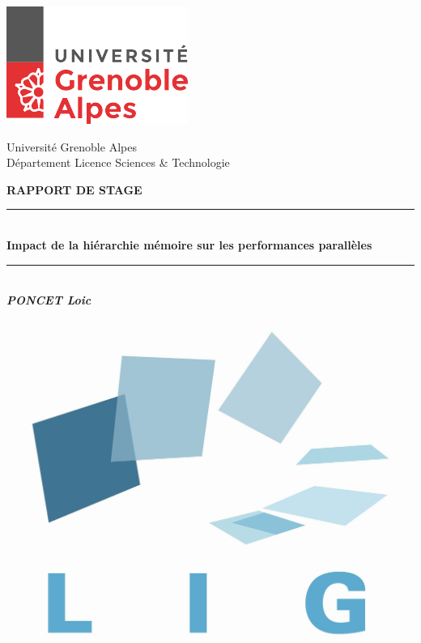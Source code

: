 \documentclass[a4paper,12pt]{report}
\begin{document}
\begin{titlepage}

\begin{center}
	\begin{flushright} %
		\includegraphics[scale=0.8]{logo-uga.png}\\[1.5cm]
	\end{flushright}
	\large{Université Grenoble Alpes\\
		   Département Licence Sciences \& Technologie\\[1.5cm]}
	
	\textbf{\LARGE{RAPPORT DE STAGE\\}}
	
	\rule{\linewidth}{0.5mm} \\[0.4cm]
	\textbf{\LARGE{Impact de la hiérarchie mémoire sur les performances parallèles}}\\[0.4cm]
	\rule{\linewidth}{0.5mm} \\[0.4cm]
	
	\textbf{\textit{	PONCET Loic\\[0.8cm]}}
	\includegraphics[scale=0.15]{LIG_coul.jpg}\\[0.8cm] %
\end{center}


\end{titlepage}
\end{document}
